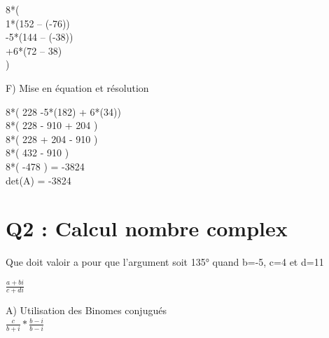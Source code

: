 \vspace{5mm} %

8*(\\

  1*(152 – (-76))\\

  -5*(144 – (-38))\\

  +6*(72 – 38)\\

)

\vspace{10mm} %


F) Mise en équation et résolution \\

\vspace{5mm} %

8*( 228 -5*(182) + 6*(34))\\

8*( 228 - 910 + 204 )\\

8*( 228 + 204 - 910 )\\

8*( 432 - 910 )\\

8*( -478 ) = -3824\\

det(A) = -3824\\


\newpage

\section{Q2 : Calcul nombre complex}

\vspace{4mm} %

Que doit valoir a pour que l’argument soit 135° quand b=-5, c=4 et d=11 \\

\vspace{4mm} %

$
\frac{a+bi}{c+di}
$

\vspace{10mm} %

A) Utilisation des Binomes conjugués \\

$
\frac{c}{b+i} * \frac{b-i}{b-i}
$

\vspace{5mm} %


